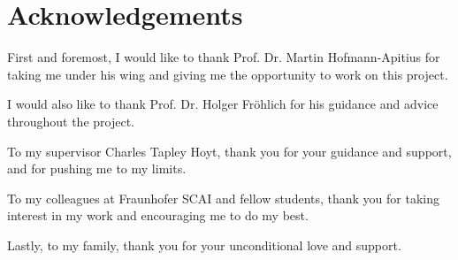 \chapter*{Acknowledgements}

First and foremost, I would like to thank Prof. Dr. Martin Hofmann-Apitius for taking me under his wing and giving me the opportunity to work on this project.

I would also like to thank Prof. Dr. Holger Fröhlich for his guidance and advice throughout the project.

To my supervisor Charles Tapley Hoyt, thank you for your guidance and support, and for pushing me to my limits.

To my colleagues at Fraunhofer SCAI and fellow students, thank you for taking interest in my work and encouraging me to do my best.

Lastly, to my family, thank you for your unconditional love and support.
